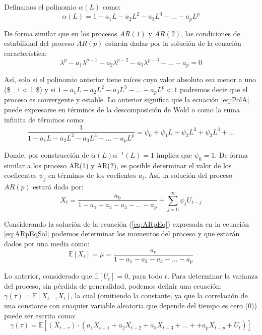 \documentclass[
]{book}
\begin{document}
Definamos el polinomio \(\alpha(L)\) como:
\begin{equation}
    \alpha(L) = 1 - a_1 L - a_2 L^2 - a_3 L^3 - \ldots - a_p L^p
    \label{eq:PolA}
\end{equation}

De forma similar que en los procesos \(AR(1)\) y \(AR(2)\), las condiciones de estabilidad del proceso \(AR(p)\) estarán dadas por la solución de la ecuación característica:
\begin{equation}
    \lambda^p - a_1 \lambda^{p-1} - a_2 \lambda^{p-2} - a_3 \lambda^{p-3} - \ldots - a_p = 0
\end{equation}

Así, solo si el polinomio anterior tiene raíces cuyo valor absoluto sea menor a uno (\$ \textbar{} \lambda\_i \textbar{} \textless{} 1 \$) y si \(1 - a_1 L - a_2 L^2 - a_3 L^3 - \ldots - a_p L^p < 1\) podremos decir que el proceso es convergente y estable. Lo anterior significa que la ecuación \eqref{eq:PolA} puede expresarse en términos de la descomposición de Wold o como la suma infinita de términos como:
\begin{equation}
    \frac{1}{1 - a_1 L  - a_2 L^2 - a_3 L^3  - \ldots - a_p L^p} = \psi_0 + \psi_1 L + \psi_2 L^2 + \psi_3 L^3 + \ldots
\end{equation}

Donde, por construcción de \(\alpha(L) \alpha^{-1}(L) = 1\) implica que \(\psi_0 = 1\). De forma similar a los proceso AR(1) y AR(2), es posible determinar el valor de los coefieentes \(\psi_j\) en términos de los coefientes \(a_i\). Así, la solución del proceso \(AR(p)\) estará dada por:
\begin{equation}
    X_t = \frac{a_0}{1 - a_1  - a_2 - a_3  - \ldots - a_p} + \sum^{\infty}_{j = 0} \psi_j U_{t-j}
    \label{eq:ARpEqSol}
\end{equation}

Considerando la solución de la ecuación (\eqref{eq:ARpEq}) expresada en la ecuación \eqref{eq:ARpEqSol} podemos determinar los momentos del proceso y que estarán dados por una media como:
\begin{equation}
    \mathbb{E}[X_t] = \mu = \frac{a_o}{1 - a_1  - a_2 - a_3  - \ldots - a_p}
\end{equation}

Lo anterior, considerado que \(\mathbb{E}[U_t] = 0\), para todo \(t\). Para determinar la varianza del proceso, sin pérdida de generalidad, podemos definir una ecuación: \(\gamma(\tau) = \mathbb{E}[X_{t - \tau} X_t]\), la cual (omitiendo la constante, ya que la correlación de una constante con cuaquier variable aleatoria que depende del tiempo es cero (0)) puede ser escrita como:
\begin{equation}
    \gamma(\tau) = \mathbb{E}[(X_{t - \tau}) \cdot (a_1 X_{t-1} + a_2 X_{t-2} + a_3 X_{t-3} + \ldots + + a_p X_{t-p} + U_t)]
\end{equation}
\end{document}
